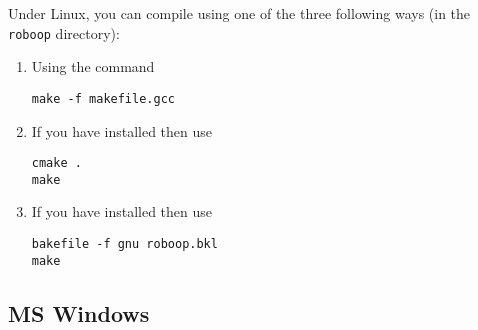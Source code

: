 \documentclass[dvips,11pt,fleqn]{report}
\begin{document}
Under \textsf{Linux}, you can compile using one of the three following
ways (in the \texttt{roboop} directory):
\begin{enumerate}
\item Using the command 
\begin{verbatim}
make -f makefile.gcc
\end{verbatim}
\item If you have
   installed
  then use
\begin{verbatim}
cmake .
make
\end{verbatim}
\item If you have
  installed then use
\begin{verbatim}
bakefile -f gnu roboop.bkl
make
\end{verbatim}
\end{enumerate}

\subsection{MS Windows}
\end{document}
